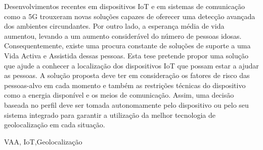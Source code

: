 


Desenvolvimentos recentes em dispositivos IoT e em sistemas de comunicação como a 5G trouxeram novas soluções capazes de oferecer uma  detecção avançada dos ambientes circundantes. Por outro lado, a esperança média de vida aumentou, levando a um aumento considerável do número de pessoas idosas. Consequentemente, existe uma procura constante de soluções de suporte a uma Vida Activa e Assistida dessas pessoas. Esta tese pretende propor uma solução que ajude a conhecer a localização dos dispositivos IoT que possam estar a ajudar as pessoas. A solução proposta deve ter em consideração os fatores de risco das pessoas-alvo em cada momento e também as restrições técnicas do dispositivo como a energia disponível e os meios de comunicação. Assim, uma decisão baseada no perfil deve ser tomada autonomamente pelo dispositivo ou pelo seu sistema integrado para garantir a utilização da melhor tecnologia de geolocalização em cada situação.





\begin{keywords}
VAA, IoT,Geolocalização
\end{keywords}
